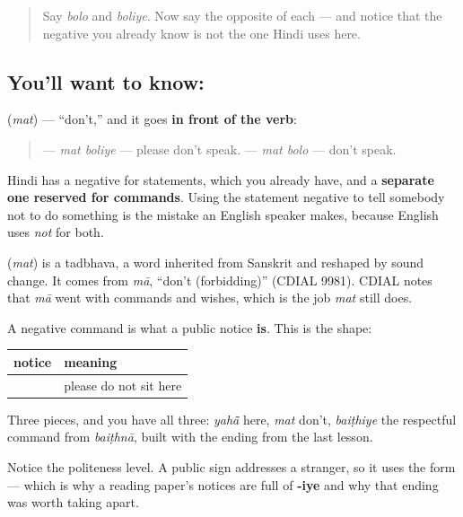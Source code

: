 \begin{quote}
Say \emph{bolo} and \emph{boliye}. Now say the opposite of each — and notice that the negative you already know is not the one Hindi uses here.
\end{quote}

\subsection*{You'll want to know: }
\textbf{} (\emph{mat}) — \textquotedblleft{}don't,\textquotedblright{} and it goes \textbf{in front of the verb}:

\begin{quote}
\textbf{ } — \emph{mat boliye} — please don't speak. \textbf{ } — \emph{mat bolo} — don't speak.
\end{quote}

Hindi has a negative for statements, which you already have, and a \textbf{separate one reserved for commands}. Using the statement negative to tell somebody not to do something is the mistake an English speaker makes, because English uses \emph{not} for both.

\begin{cousinweb}
\textbf{} (\emph{mat}) is a tadbhava, a word inherited from Sanskrit and reshaped by sound change. It comes from \emph{mā}, \textquotedblleft{}don't (forbidding)\textquotedblright{} (CDIAL 9981). CDIAL notes that \emph{mā} went with commands and wishes, which is the job \emph{mat} still does.
\end{cousinweb}

\begin{grammarlens}[title={Grammar Lens: the sign you will actually meet it on}]
A negative command is what a public notice \textbf{is}. This is the shape:

\noindent
\begin{tabularx}{\linewidth}{@{}>{\raggedright\arraybackslash}X>{\raggedright\arraybackslash}X@{}}
\toprule
\textbf{notice} & \textbf{meaning} \\
\midrule
\hi{यहाँ} \hi{मत} \hi{बैठिए} & please do not sit here \\
\bottomrule
\end{tabularx}

Three pieces, and you have all three: \emph{yahā̃} here, \emph{mat} don't, \emph{baiṭhiye} the respectful command from \emph{baiṭhnā}, built with the ending from the last lesson.

Notice the politeness level. A public sign addresses a stranger, so it uses the \textbf{} form — which is why a reading paper's notices are full of \textbf{-iye} and why that ending was worth taking apart.
\end{grammarlens}

